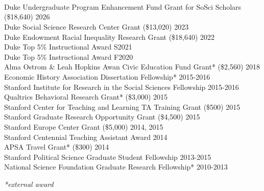 \documentclass[11pt]{article}
\begin{document}
\vspace{.3in}
\begin{minipage}[t]{.21\textwidth}
  \hspace*{.4in}  \\
	\hspace*{.18in}  \\
	\hspace*{.1in} \\
\end{minipage}
\begin{minipage}[t]{.79\textwidth}

	Duke Undergraduate Program Enhancement Fund Grant for SoSci Scholars (\$18,640) \hfill 2026 \\
	Duke Social Science Research Center Grant (\$13,020) \hfill 2023 \\
	Duke Endowment Racial Inequality Research Grant (\$18,640) \hfill 2022 \\
	Duke Top 5\% Instructional Award \hfill S2021 \\
	Duke Top 5\% Instructional Award \hfill F2020 \\
	Alma Ostrom \& Leah Hopkins Awan Civic Education Fund Grant* (\$2,560) \hfill 2018 \\

	\vspace{-.1in}
  Economic History Association Dissertation Fellowship* 				\hfill 2015-2016 \\
  Stanford Institute for Research in the Social Sciences Fellowship 	\hfill 2015-2016 \\
  Qualtrics Behavioral Research Grant* (\$3,000)  					\hfill 2015 \\
  Stanford Center for Teaching and Learning TA Training Grant (\$500) 	\hfill 2015\\
  Stanford Graduate Research Opportunity Grant (\$4,500) 				\hfill 2015 \\
	Stanford Europe Center Grant (\$5,000)  								\hfill 2014, 2015  \\
  Stanford Centennial Teaching Assistant Award							\hfill	 2014 \\
	APSA Travel Grant* (\$300)												\hfill 2014  \\
	Stanford Political Science Graduate Student Fellowship					\hfill 2013-2015\\
	National Science Foundation Graduate Research Fellowship*	 		\hfill 2010-2013

	\emph{*\scriptsize external award}	\\
\end{minipage}
\end{document}
